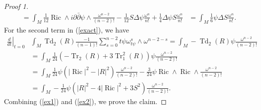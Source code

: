 \documentclass[12pt,reqno,a4paper]{amsart}
\numberwithin{equation}{section}
\def\p{\partial}
\def\bp{\bar\partial}
\DeclareMathOperator{\Td}{Td}
\DeclareMathOperator{\Tr}{Tr}
\DeclareMathOperator{\ric}{Ric}
\theoremstyle{remark}
\theoremstyle{dotless}
\begin{document}
\begin{proof}[Proof 1]
\begin{align}
=\int_M \frac{1}{12} \ric\wedge i\p\bp\psi\wedge\frac{\omega^{n-2}}{(n-2)!}-\frac{1}{12}S\Delta\psi\frac{\omega^{n}}{n!}+\frac{1}{4}\Delta\psi S \frac{\omega^{n}}{n!} &=\int_M \frac{1}{6}\psi \Delta S\frac{\omega^{n}}{n!}.
\end{align}
For the second term in (\ref{exact}), we have
\begin{align}\label{ex2}
\left.\frac{d}{dt} \right|_{t=0}& \int_M \Td_2(R)\frac{-1}{(n-1)!}\sum^{n-2}_{s=0}t\psi \omega_{t\psi}^s\wedge \omega^{n-2-s} = \int_M -\Td_2(R)\psi\frac{\omega^{n-2}}{(n-2)!} \nonumber \\
&= \int_M \frac{1}{24}\left( -\Tr_2(R)+3\Tr_1^2(R) \right)\psi \frac{\omega^{n-2}}{(n-2)!}\nonumber \\
&= \int_M \frac{1}{24}\psi\left(|\ric|^2-|R|^2\right)\frac{\omega^{n-2}}{(n-2)!}-\frac{3}{24}\psi\ric\wedge\ric\wedge\frac{\omega^{n-2}}{(n-2)!}\nonumber\\
&=\int_M -\frac{1}{24}\psi\left(|R|^2-4|\ric|^2+3S^2\right)\frac{\omega^{n-2}}{(n-2)!}.
\end{align}
Combining (\ref{ex1}) and (\ref{ex2}), we prove the claim.
\end{proof}
\end{document}
